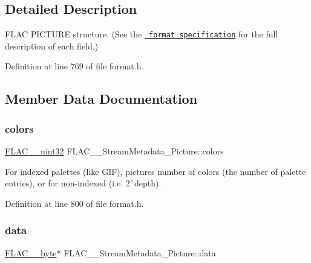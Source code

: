 \subsection{Detailed Description}
F\+L\+AC P\+I\+C\+T\+U\+RE structure. (See the \href{../format.html\#metadata_block_picture}{\texttt{ format specification}} for the full description of each field.) 

Definition at line 769 of file format.\+h.



\subsection{Member Data Documentation}
\mbox{\label{struct_f_l_a_c_____stream_metadata___picture_af17c1738bab67eba049ee101acfd36f0}} 
\subsubsection{\texorpdfstring{colors}{colors}}
{\footnotesize\ttfamily \mbox{\hyperlink{ordinals_8h_a9c4005ea7ef8d564b0cc993cdd0e4e5e}{F\+L\+A\+C\+\_\+\+\_\+uint32}} F\+L\+A\+C\+\_\+\+\_\+\+Stream\+Metadata\+\_\+\+Picture\+::colors}

For indexed palettes (like G\+IF), picture\textquotesingle{}s number of colors (the number of palette entries), or {} for non-\/indexed (i.\+e. 2$^\wedge$depth). 

Definition at line 800 of file format.\+h.

\mbox{\label{struct_f_l_a_c_____stream_metadata___picture_a9c71b5d77920e6d3aee6893795c43605}} 
\subsubsection{\texorpdfstring{data}{data}}
{\footnotesize\ttfamily \mbox{\hyperlink{ordinals_8h_a5eb569b12d5b047cdacada4d57924ee3}{F\+L\+A\+C\+\_\+\+\_\+byte}}$\ast$ F\+L\+A\+C\+\_\+\+\_\+\+Stream\+Metadata\+\_\+\+Picture\+::data}

